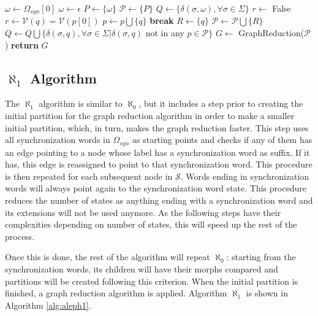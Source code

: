 {\begin{algorithm}
  \caption{$\aleph_0$($\mathcal{S}, \Omega_{syn}$)\label{alg:aleph0}}
    \begin{algorithmic}[1]
      \Procedure{}{}
      		\State $\omega \gets \Omega_{syn}[0]$
      	\Else
      		\State $\omega \gets \epsilon$
      	\EndIf
      	\State $P \gets \{\omega\}$
      	\State $\mathcal{P} \gets \{P\}$
      	\State $Q \gets \{\delta(\sigma,\omega), \forall \sigma \in \Sigma\}$
      		\State $r \gets$ False
      			\State $r \gets \mathcal{V}(q) = \mathcal{V}(p[0])$
      				\State $p \gets p\bigcup\{q\}$
      				\State \textbf{break}
      			\EndIf
      		\EndFor
      			\State $R \gets \{q\}$
      			\State $\mathcal{P} \gets \mathcal{P}\bigcup\{R\}$
      		\EndIf 
      		\State $Q \gets Q\bigcup\{\delta(\sigma,q),\forall \sigma\in\Sigma|\delta(\sigma,q)$ not in any $p\in\mathcal{P}\}$
      	\EndFor
      	\State $G \gets$ GraphReduction($\mathcal{P}$)
      	\State \textbf{return} $G$
      \EndProcedure
    \end{algorithmic}
  \end{algorithm}

\subsection{$\aleph_1$ Algorithm}

The $\aleph_1$ algorithm is similar to $\aleph_0$, but it includes a step prior to creating the initial partition for the graph reduction algorithm in order to make a smaller initial partition, which, in turn, makes the graph reduction faster. This step uses all synchronization words in $\Omega_{syn}$ as starting points and checks if any of them has an edge pointing to a node whose label has a synchronization word as suffix. If it has, this edge is reassigned to point to that synchronization word. This procedure is then repeated for each subsequent node in $\mathcal{S}$. Words ending in synchronization words will always point again to the synchronization word state. This procedure reduces the number of states as anything ending with a synchronization word and its extensions will not be used anymore. As the following steps have their complexities depending on number of states, this will speed up the rest of the process.

Once this is done, the rest of the algorithm will repeat $\aleph_0$: starting from the synchronization words, its children will have their morphs compared and partitions will be created following this criterion. When the initial partition is finished, a graph reduction algorithm is applied. Algorithm $\aleph_1$ is shown in Algorithm \ref{alg:aleph1}.

}
